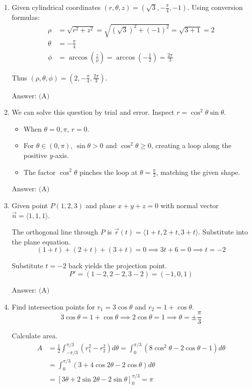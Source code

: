 \documentclass[a4paper, 12pt]{article}
\begin{document}
\begin{enumerate}[leftmargin=*,label=\textbf{\arabic*.}]

\item Given cylindrical coordinates $(r, \theta, z) = \left(\sqrt{3}, -\frac{\pi}{4}, -1\right)$. Using conversion formulas:
\begin{align*}
\rho &= \sqrt{r^2 + z^2} = \sqrt{(\sqrt{3})^2 + (-1)^2} = \sqrt{3 + 1} = 2 \\
\theta &= -\frac{\pi}{4} \\
\phi &= \arccos\left(\frac{z}{\rho}\right) = \arccos\left(-\frac{1}{2}\right) = \frac{2\pi}{3}
\end{align*}

Thus $(\rho, \theta, \phi) = \left(2, -\frac{\pi}{4}, \frac{2\pi}{3}\right)$.

$\boxed{\text{Answer: (A)}}$

\item We can solve this question by trial and error. Inspect $r = \cos^2\theta \sin\theta$.
\begin{itemize}[leftmargin=*]
    \item When $\theta = 0, \pi$, $r = 0$.
    \item For $\theta \in (0, \pi)$, $\sin\theta > 0$ and $\cos^2\theta \ge 0$, creating a loop along the positive $y$-axis.
    \item The factor $\cos^2\theta$ pinches the loop at $\theta = \frac{\pi}{2}$, matching the given shape.
\end{itemize}

$\boxed{\text{Answer: (A)}}$

\item Given point $P(1,2,3)$ and plane $x + y + z = 0$ with normal vector $\vec{n} = \langle 1, 1, 1 \rangle$.

The orthogonal line through $P$ is $\vec{r}(t) = \langle 1+t, 2+t, 3+t \rangle$. Substitute into the plane equation.
\[(1+t) + (2+t) + (3+t) = 0 \implies 3t + 6 = 0 \implies t = -2\]

Substitute $t = -2$ back yields the projection point.
\[P' = (1 - 2, 2 - 2, 3 - 2) = (-1, 0, 1)\]

$\boxed{\text{Answer: (A)}}$

\item Find intersection points for $r_1 = 3\cos\theta$ and $r_2 = 1 + \cos\theta$.
\[3\cos\theta = 1 + \cos\theta \implies 2\cos\theta = 1 \implies \theta = \pm \frac{\pi}{3}\]

Calculate area.
\begin{align*}
    A &= \frac{1}{2} \int_{-\pi/3}^{\pi/3} \left( r_1^2 - r_2^2 \right) d\theta = \int_{0}^{\pi/3} \left( 8\cos^2\theta - 2\cos\theta - 1 \right) d\theta \\
      &= \int_{0}^{\pi/3} \left( 3 + 4\cos 2\theta - 2\cos\theta \right) d\theta \\
      &= \left[ 3\theta + 2\sin 2\theta - 2\sin\theta \right]_0^{\pi/3} = \pi
\end{align*}


\end{enumerate}
\end{document}
